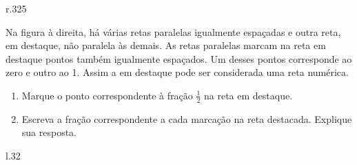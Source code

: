 \begin{atividade}{}\label{chap3-ativ10}

\begin{wrapfigure}[7]{r}{.325\linewidth}
\vspace{-1em}
\resizebox{\linewidth}{!}
{
}
\end{wrapfigure}

Na figura à direita, há várias retas paralelas igualmente espaçadas e outra reta, em destaque, não paralela às demais. As retas paralelas marcam na reta em destaque pontos também igualmente espaçados. Um desses pontos corresponde ao zero e outro ao 1. Assim a em destaque pode ser considerada uma reta numérica.

\begin{enumerate} %
  \item     Marque o ponto correspondente à fração $\frac{1}{2}$ na reta em destaque.
  \item     Escreva a fração correspondente a cada marcação na reta destacada. Explique sua resposta.
  \end{enumerate}
  
\begin{wrapfigure}[7]{l}{.32\linewidth}
\vspace{-1em}
\resizebox{\linewidth}{!}
{
}
\end{wrapfigure}
\end{atividade}

